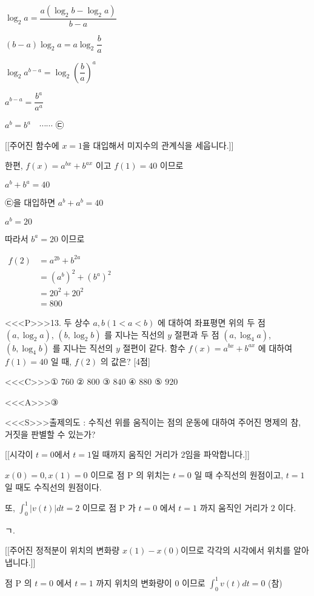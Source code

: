 \documentclass{oblivoir}
\begin{document}
$\log _{2} a=\dfrac{a\left(\log _{2} b-\log _{2} a\right)}{b-a}$

$(b-a) \log _{2} a=a \log _{2} \dfrac{b}{a}$

$\log _{2} a^{b-a}=\log _{2}\left(\dfrac{b}{a}\right)^{a}$

$a^{b-a}=\dfrac{b^{a}}{a^{a}}$

$a^{b}=b^{a} \quad \cdots \cdots$ ㉢

[[주어진 함수에 $x=1$을 대입해서 미지수의 관계식을 세웁니다.]]

한편, $f(x)=a^{b x}+b^{a x}$ 이고
$f(1)=40$ 이므로

$a^{b}+b^{a}=40$

㉢을 대입하면 $a^{b}+a^{b}=40$

$a^{b}=20$

따라서 $b^{a}=20$ 이므로

$\begin{aligned} f(2) &=a^{2 b}+b^{2 a} \\ &=\left(a^{b}\right)^{2}+\left(b^{a}\right)^{2} \\ &=20^{2}+20^{2} \\ &=800 \end{aligned}$


<<<P>>>13. 두 상수 $a, b(1< a< b)$ 에 대하여 좌표평면 위의 두 점 $\left(a, \log _{2} a\right)$, $\left(b, \log _{2} b\right)$ 를 지나는 직선의 $y$ 절편과 두 점 $\left(a, \log _{4} a\right)$, $\left(b, \log _{4} b\right)$ 를 지나는 직선의 $y$ 절편이 같다. 함수 $f(x)=a^{b x}+b^{a x}$ 에 대하여 $f(1)=40$ 일 때, $f(2)$ 의 값은? [4점]

<<<C>>>① $760$
② $800$
③ $840$
④ $880$
⑤ $920$


<<<A>>>③

<<<S>>>출제의도 : 수직선 위를 움직이는 점의 운동에 대하여 주어진 명제의 참, 거짓을 판별할 수 있는가?

[[시각이 $t=0$에서 $t=1$일 때까지 움직인 거리가 $2$임을 파악합니다.]]

$x(0)=0, x(1)=0$ 이므로 점 $\mathrm{P}$ 의 위치는 $t=0$ 일 때 수직선의 원점이고, $t=1$ 일 때도 수직선의 원점이다.

또, $\displaystyle\int_{0}^{1}|v(t)| d t=2$ 이므로 점 $\mathrm{P}$ 가 $t=0$ 에서 $t=1$ 까지 움직인 거리가 $2$ 이다.


ㄱ. 

[[주어진 정적분이 위치의 변화량 $x(1)-x(0)$이므로 각각의 시각에서 위치를 알아냅니다.]]

점 $\mathrm{P}$ 의 $t=0$ 에서 $t=1$ 까지 위치의 변화량이 $0$ 이므로
$\displaystyle\int_{0}^{1} v(t) d t=0$ (참)
\end{document}
